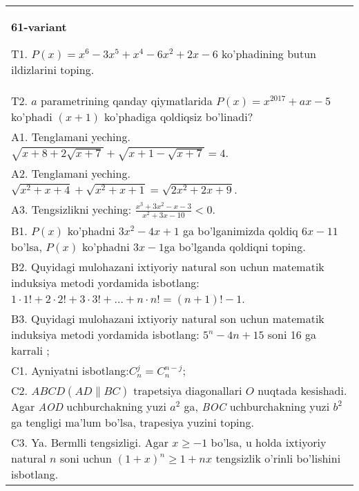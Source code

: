 \documentclass{article}
\begin{document}
\begin{tabular}{m{17cm}}
\textbf{61-variant}
\newline

T1. \(P(x) = x^{6} - 3x^{5} + x^{4} - 6x^{2} + 2x - 6\) ko'phadining butun ildizlarini toping. \\
T2. \(a\) parametrining qanday qiymatlarida \(P(x) = x^{2017} + ax - 5\) ko'phadi \((x + 1)\) ko'phadiga qoldiqsiz bo'linadi? \\
A1. Tenglamani yeching. \(\sqrt{x + 8 + 2\sqrt{x + 7}} + \sqrt{x + 1 - \sqrt{x + 7}} = 4\). \\
A2. Tenglamani yeching. \(\sqrt{x^{2} + x + 4} + \sqrt{x^{2} + x + 1} = \sqrt{2x^{2} + 2x + 9}\). \\
A3. Tengsizlikni yeching: \(\frac{x^{3} + 3x^{2} - x - 3}{x^{2} + 3x - 10} < 0\). \\
B1. \(P(x)\) ko'phadni \(3x^{2} - 4x + 1\) ga bo'lganimizda qoldiq \(6x - 11\) bo'lsa, \(P(x)\) ko'phadni \(3x - 1\)ga bo'lganda qoldiqni toping. \\
B2. Quyidagi mulohazani ixtiyoriy natural son uchun matematik induksiya metodi yordamida isbotlang: \(1 \cdot 1! + 2 \cdot 2! + 3 \cdot 3! + \ldots + n \cdot n! = (n + 1)! - 1\). \\
B3. Quyidagi mulohazani ixtiyoriy natural son uchun matematik induksiya metodi yordamida isbotlang: \(5^{n} - 4n + 15\) soni 16 ga karrali ; \\
C1. Ayniyatni isbotlang:\(C_{n}^{j} = C_{n}^{n - j}\); \\
C2. \(ABCD(AD\| BC)\) trapetsiya diagonallari \(O\) nuqtada kesishadi. Agar \emph{AOD} uchburchakning yuzi \(a^{2}\) ga, \emph{BOC} uchburchakning yuzi \(b^{2}\) ga tengligi ma'lum bo'lsa, trapesiya yuzini toping. \\
C3. Ya. Bermlli tengsizligi. Agar \(x \geq - 1\) bo'lsa, u holda ixtiyoriy natural \(n\) soni uchun \((1 + x)^{n} \geq 1 + nx\) tengsizlik o'rinli bo'lishini isbotlang. \\

\end{tabular}
\vspace{1cm}
\end{document}

